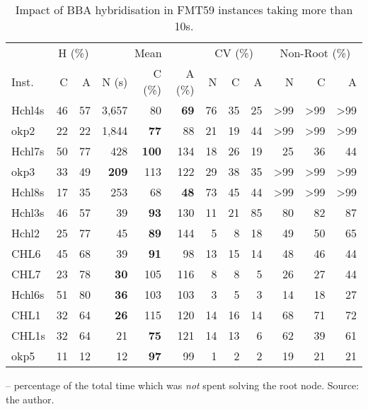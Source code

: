\documentclass[ppgc,tese,english,formais,babel]{iiufrgs}
\newcommand{\bestcolumnemph}[1]{\textbf{#1}}
\begin{document}
\begin{table}
\caption{Impact of BBA hybridisation in FMT59 instances taking more than 10s.}
\label{tab:g2kp_hyb_selected_instances}
\begin{center}
\begin{tabular}{lrrrrrrrrrrr}
\hline\hline
& \multicolumn{2}{c}{H (\%)} & \multicolumn{3}{c}{Mean} & \multicolumn{3}{c}{CV (\%)} & \multicolumn{3}{c}{Non-Root (\%)} \\\cmidrule(lr){2-3}\cmidrule(lr){4-6}\cmidrule(lr){7-9}\cmidrule(lr){10-12}
Inst. & C & A & N (s) & C (\%) & A (\%) & N & C & A & N & C & A \\\hline\hline
Hchl4s & 46 & 57 & 3,657 & 80 & \bestcolumnemph{69} & 76 & 35 & 25 & >99 & >99 & >99 \\
okp2 & 22 & 22 & 1,844 & \bestcolumnemph{77} & 88 & 21 & 19 & 44 & >99 & >99 & >99 \\
Hchl7s & 50 & 77 & 428 & \bestcolumnemph{100} & 134 & 18 & 26 & 19 & 25 & 36 & 44 \\
okp3 & 33 & 49 & \bestcolumnemph{209} & 113 & 122 & 29 & 38 & 35 & >99 & >99 & >99 \\
Hchl8s & 17 & 35 & 253 & 68 & \bestcolumnemph{48} & 73 & 45 & 44 & >99 & >99 & >99 \\
Hchl3s & 46 & 57 & 39 & \bestcolumnemph{93} & 130 & 11 & 21 & 85 & 80 & 82 & 87 \\
Hchl2 & 25 & 77 & 45 & \bestcolumnemph{89} & 144 & 5 & 8 & 18 & 49 & 50 & 65 \\
CHL6 & 45 & 68 & 39 & \bestcolumnemph{91} & 98 & 13 & 15 & 14 & 48 & 46 & 44 \\
CHL7 & 23 & 78 & \bestcolumnemph{30} & 105 & 116 & 8 & 8 & 5 & 26 & 27 & 44 \\
Hchl6s & 51 & 80 & \bestcolumnemph{36} & 103 & 103 & 3 & 5 & 3 & 14 & 18 & 27 \\
CHL1 & 32 & 64 & \bestcolumnemph{26} & 115 & 120 & 14 & 16 & 14 & 68 & 71 & 72 \\
CHL1s & 32 & 64 & 21 & \bestcolumnemph{75} & 121 & 14 & 13 & 6 & 62 & 39 & 61 \\
okp5 & 11 & 12 & 12 & \bestcolumnemph{97} & 99 & 1 & 2 & 2 & 19 & 21 & 21 \\\hline\hline
\end{tabular}
 -- percentage of the total time which was \emph{not} spent solving the root node. Source: the author.
\end{center}
\end{table}
\end{document}
